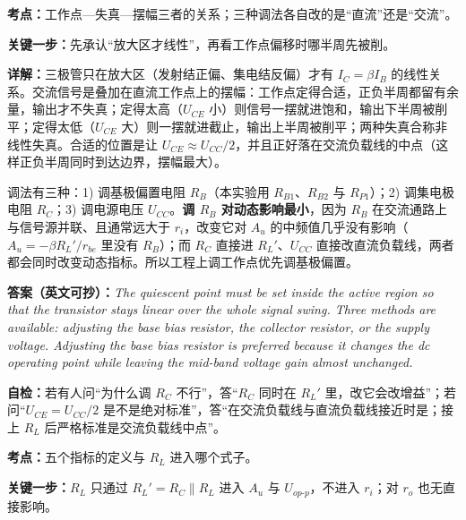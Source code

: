 \documentclass[11pt]{ctexart}
\let\origsubhdr\subhdr
\renewcommand{\subhdr}[1]{\needspace{3\baselineskip}\origsubhdr{#1}}
\begin{document}


\textbf{考点：}工作点—失真—摆幅三者的关系；三种调法各自改的是“直流”还是“交流”。

\textbf{关键一步：}先承认“放大区才线性”，再看工作点偏移时哪半周先被削。

\textbf{详解：}三极管只在放大区（发射结正偏、集电结反偏）才有 $I_C=\beta I_B$ 的线性关系。交流信号是叠加在直流工作点上的摆幅：工作点定得合适，正负半周都留有余量，输出才不失真；定得太高（$U_{CE}$ 小）则信号一摆就进饱和，输出下半周被削平；定得太低（$U_{CE}$ 大）则一摆就进截止，输出上半周被削平；两种失真合称非线性失真。合适的位置是让 $U_{CE}\approx U_{CC}/2$，并且正好落在交流负载线的中点（这样正负半周同时到达边界，摆幅最大）。

调法有三种：1) 调基极偏置电阻 $R_B$（本实验用 $R_{B1}$、$R_{B2}$ 与 $R_{P1}$）；2) 调集电极电阻 $R_C$；3) 调电源电压 $U_{CC}$。\textbf{调 $R_B$ 对动态影响最小}，因为 $R_B$ 在交流通路上与信号源并联、且通常远大于 $r_i$，改变它对 $A_u$ 的中频值几乎没有影响（$A_u=-\beta R_L'/r_{be}$ 里没有 $R_B$）；而 $R_C$ 直接进 $R_L'$、$U_{CC}$ 直接改直流负载线，两者都会同时改变动态指标。所以工程上调工作点优先调基极偏置。

\textbf{答案（英文可抄）：}\textit{The quiescent point must be set inside the active region so that the transistor stays linear over the whole signal swing. Three methods are available: adjusting the base bias resistor, the collector resistor, or the supply voltage. Adjusting the base bias resistor is preferred because it changes the dc operating point while leaving the mid-band voltage gain almost unchanged.}

\textbf{自检：}若有人问“为什么调 $R_C$ 不行”，答“$R_C$ 同时在 $R_L'$ 里，改它会改增益”；若问“$U_{CE}=U_{CC}/2$ 是不是绝对标准”，答“在交流负载线与直流负载线接近时是；接上 $R_L$ 后严格标准是交流负载线中点”。



\textbf{考点：}五个指标的定义与 $R_L$ 进入哪个式子。

\textbf{关键一步：}$R_L$ 只通过 $R_L'=R_C\parallel R_L$ 进入 $A_u$ 与 $U_{op\text{-}p}$，不进入 $r_i$；对 $r_o$ 也无直接影响。
\end{document}
